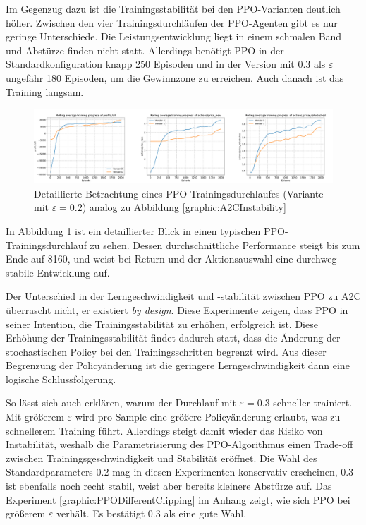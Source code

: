 Im Gegenzug dazu ist die Trainingsstabilität bei den PPO-Varianten deutlich höher.
Zwischen den vier Trainingsdurchläufen der PPO-Agenten gibt es nur geringe Unterschiede.
Die Leistungsentwicklung liegt in einem schmalen Band und Abstürze finden nicht statt.
Allerdings benötigt PPO in der Standardkonfiguration knapp 250 Episoden und in der Version mit $0.3$ als $\varepsilon$ ungefähr 180 Episoden, um die Gewinnzone zu erreichen.
Auch danach ist das Training langsam.
\begin{figure}[htbp]
	\centering
	\includegraphics[width=\textwidth]{main/ppo_detailed_analysis.pdf}
	\caption{Detaillierte Betrachtung eines PPO-Trainingsdurchlaufes (Variante mit $\varepsilon=0.2$) analog zu Abbildung \ref{graphic:A2CInstability}}
	\label{graphic:PPOStability}
\end{figure}
In Abbildung \ref{graphic:PPOStability} ist ein detaillierter Blick in einen typischen PPO-Trainingsdurchlauf zu sehen.
Dessen durchschnittliche Performance steigt bis zum Ende auf 8160, und weist bei Return und der Aktionsauswahl eine durchweg stabile Entwicklung auf.

Der Unterschied in der Lerngeschwindigkeit und -stabilität zwischen PPO zu A2C überrascht nicht, er existiert \textit{by design}.
Diese Experimente zeigen, dass PPO in seiner Intention, die Trainingsstabilität zu erhöhen, erfolgreich ist.
Diese Erhöhung der Trainingsstabilität findet dadurch statt, dass die Änderung der stochastischen Policy bei den Trainingsschritten begrenzt wird.
Aus dieser Begrenzung der Policyänderung ist die geringere Lerngeschwindigkeit dann eine logische Schlussfolgerung.

So lässt sich auch erklären, warum der Durchlauf mit $\varepsilon=0.3$ schneller trainiert.
Mit größerem $\varepsilon$ wird pro Sample eine größere Policyänderung erlaubt, was zu schnellerem Training führt.
Allerdings steigt damit wieder das Risiko von Instabilität, weshalb die Parametrisierung des PPO-Algorithmus einen Trade-off zwischen Trainingsgeschwindigkeit und Stabilität eröffnet.
Die Wahl des Standardparameters $0.2$ mag in diesen Experimenten konservativ erscheinen, $0.3$ ist ebenfalls noch recht stabil, weist aber bereits kleinere Abstürze auf.
Das Experiment \ref{graphic:PPODifferentClipping} im Anhang zeigt, wie sich PPO bei größerem $\varepsilon$ verhält.
Es bestätigt $0.3$ als eine gute Wahl.

